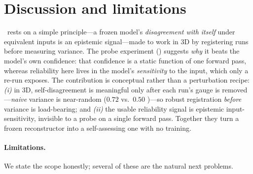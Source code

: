 \section{Discussion and limitations}
\label{sec:discussion}

\trustr\ rests on a simple principle---a frozen model's \emph{disagreement with itself} under
equivalent inputs is an epistemic signal---made to work in 3D by registering runs before measuring
variance. The probe experiment () suggests \emph{why} it beats the model's own
confidence: that confidence is a static function of one forward pass, whereas reliability here lives
in the model's \emph{sensitivity} to the input, which only a re-run exposes. The contribution is
conceptual rather than a perturbation recipe: \emph{(i)} in 3D, self-disagreement is meaningful only
after each run's gauge is removed---\emph{naive} variance is near-random ($0.72$ vs.\ $0.50$
\ause)---so robust registration \emph{before} variance is load-bearing; and \emph{(ii)} the usable
reliability signal is epistemic input-sensitivity, invisible to a probe on a single forward pass.
Together they turn a frozen reconstructor into a self-assessing one with no training.

\paragraph{Limitations.} We state the scope honestly; several of these are the natural next problems.

